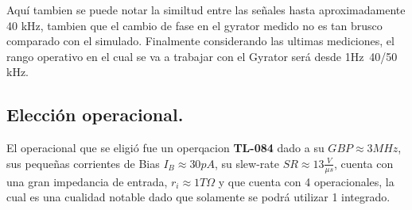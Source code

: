 \documentclass[a4paper]{article}
\begin{document}
 Aquí tambien se puede notar la similtud entre las señales hasta aproximadamente 40 kHz, tambien que el cambio de fase en el gyrator medido no es tan brusco comparado  con el simulado.
Finalmente considerando las ultimas mediciones, el rango operativo en el cual se va  a trabajar con el Gyrator será desde 1Hz~40/50 kHz.
\subsection{Elección operacional.}
El operacional que se eligió fue un operqacion \textbf{TL-084} dado a su $GBP \approx 3MHz$, sus pequeñas corrientes de Bias $I_B \approx 30pA$, su slew-rate $SR \approx 13 \frac{V}{\mu s}$, cuenta con una gran impedancia de entrada, $ r_i \approx 1T \Omega $ y que cuenta con 4 operacionales, la cual es una cualidad notable dado que solamente se podrá utilizar 1 integrado.

 \flushleft
\end{document}
